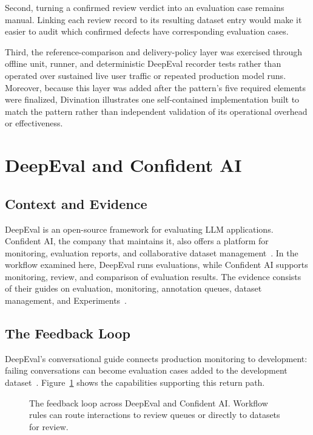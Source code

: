 Second, turning a confirmed review verdict into an evaluation case remains
manual. Linking each review record to its resulting dataset entry would make it
easier to audit which confirmed defects have corresponding evaluation cases.

Third, the reference-comparison and delivery-policy layer was exercised through
offline unit, runner, and deterministic DeepEval recorder tests rather than
operated over sustained live user traffic or repeated production model runs.
Moreover, because this layer was added after the pattern's five required
elements were finalized, Divination illustrates one self-contained
implementation built to match the pattern rather than independent validation of
its operational overhead or effectiveness.

\section{DeepEval and Confident AI}
\label{sec:case-deepeval}

\subsection{Context and Evidence}

DeepEval is an open-source framework for evaluating LLM applications. Confident
AI, the company that maintains it, also offers a platform for monitoring,
evaluation reports, and collaborative dataset
management~\parencite{ConfidentAI:DocsIndex}. In the workflow examined here,
DeepEval runs evaluations, while Confident AI supports monitoring, review,
and comparison of evaluation results. The evidence consists of their guides on
evaluation, monitoring, annotation queues, dataset management, and
Experiments~\parencite{ConfidentAI:Experiments}.

\subsection{The Feedback Loop}

DeepEval's conversational guide connects production monitoring to development:
failing conversations can become evaluation cases added to the development
dataset~\parencite{DeepEval:MultiTurn}. Figure~\ref{fig:case-deepeval} shows
the capabilities supporting this return path.

\begin{figure}[H]
  \centering
  
  \caption{The feedback loop across DeepEval and Confident AI. Workflow rules
    can route interactions to review queues or directly to datasets for review.}
  \label{fig:case-deepeval}
\end{figure}

